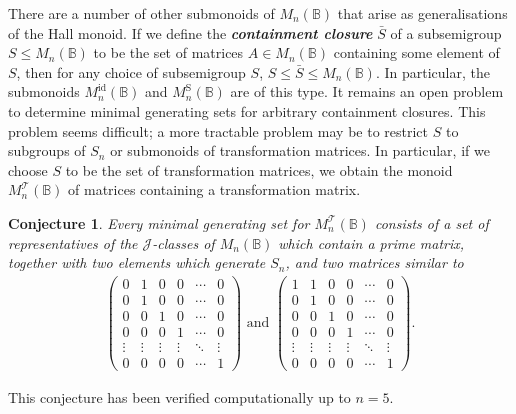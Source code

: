 \documentclass[11pt]{article}
\newtheorem*{conj}{Conjecture}
\newcommand{\defn}[1]{\textbf{\textit{#1}}}
\numberwithin{equation}{section}
\newcommand{\B}{\mathbb{B}}
\newcommand{\Bn}{M_n(\B)}
\newcommand{\Refln}{M_n^{\text{id}}(\B)}
\newcommand{\Halln}{M_n^{\text{S}}(\B)}
\newcommand{\MTn}{M_n^{\mathcal{T}}(\B)}
\newcommand{\J}{\mathscr{J}}
\begin{document}
There are a number of other submonoids of $\Bn$ that arise as generalisations of
the Hall monoid. If we define the \defn{containment closure} $\bar{S}$ of a
subsemigroup $S \leq \Bn$ to be the set of matrices $A \in \Bn$ containing some
element of $S$, then for any choice of subsemigroup $S$, $S \leq \bar{S} \leq
\Bn$. In particular, the submonoids $\Refln$ and $\Halln$ are of this
type. It remains an open problem to determine minimal generating sets for
arbitrary containment closures. This problem seems difficult; a more tractable
problem may be to restrict $S$ to subgroups of $S_n$ or submonoids of
transformation matrices. In particular, if we choose $S$ to be the set of
transformation matrices, we obtain the monoid $\MTn$ of matrices containing a
transformation matrix.

\begin{conj}
  Every minimal generating set for $\MTn$ consists of a set of
  representatives of the $\J$-classes of $\Bn$ which contain a prime matrix,
  together with two elements which generate $S_n$, and two matrices similar to
  \begin{align*}
  \begin{pmatrix}
    0 & 1 & 0 & 0 & \cdots & 0 \\
    0 & 1 & 0 & 0 & \cdots & 0 \\
    0 & 0 & 1 & 0 & \cdots & 0 \\
    0 & 0 & 0 & 1 & \cdots & 0 \\
    \vdots  & \vdots & \vdots & \vdots & \ddots & \vdots\\
    0 & 0 & 0 & 0 & \cdots & 1
  \end{pmatrix}\text{ and } 
  \begin{pmatrix}
    1 & 1 & 0 & 0 & \cdots & 0 \\
    0 & 1 & 0 & 0 & \cdots & 0 \\
    0 & 0 & 1 & 0 & \cdots & 0 \\
    0 & 0 & 0 & 1 & \cdots & 0 \\
    \vdots  & \vdots & \vdots & \vdots & \ddots & \vdots\\
    0 & 0 & 0 & 0 & \cdots & 1
  \end{pmatrix}.
  \end{align*}
\end{conj}
\noindent This conjecture has been verified computationally up to $n = 5$.

\end{document}

